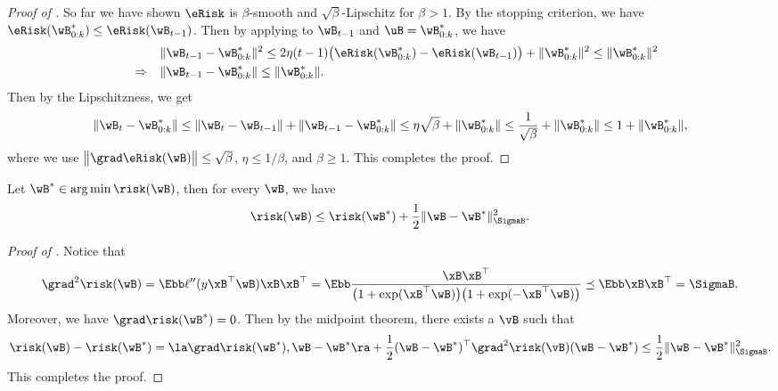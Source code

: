 \documentclass[11pt]{article}
\begin{document}
\begin{proof}[Proof of ]
So far we have shown $\eRisk$ is $\beta$-smooth and $\sqrt{\beta}$-Lipschitz for $\beta>1$. 
By the stopping criterion, we have $\eRisk(\wB^*_{0:k})\le \eRisk(\wB_{t-1})$.
Then by applying  to $\wB_{t-1}$ and $\uB=\wB^*_{0:k}$, we have 
\begin{align*}
  &  \|\wB_{t-1}-\wB^*_{0:k}\|^2 \le 2\eta (t-1) \big(\eRisk(\wB^*_{0:k}) - \eRisk(\wB_{t-1}) \big) + \|\wB^*_{0:k}\|^2 \le \|\wB^*_{0:k}\|^2 \\
    \quad \Rightarrow \quad &
    \|\wB_{t-1} - \wB^*_{0:k}\|\le \|\wB^*_{0:k}\|.
\end{align*}
Then by the Lipschitzness, we get 
\begin{align*}
   \|\wB_{t} - \wB^*_{0:k}\|\le \|\wB_{t} - \wB_{t-1}\| + \|\wB_{t-1} - \wB^*_{0:k}\|\le \eta \sqrt{\beta} + \|\wB^*_{0:k}\|
   \le \frac{1}{\sqrt{\beta}} + \|\wB^*_{0:k}\| \le 1 + \|\wB^*_{0:k}\|,
\end{align*}
where we use $\big\|\grad \eRisk(\wB)\big\|\le \sqrt{\beta}$, $\eta\le 1/\beta$, and $\beta\ge 1$. This completes the proof.
\end{proof}


\begin{lemma}\label{lemma:loss-tail}
Let $\wB^*\in \arg\min \risk(\wB)$, then for every $\wB$, we have 
\begin{align*}
\risk(\wB) \le \risk(\wB^*) + \frac{1}{2}\|\wB - \wB^*\|_{\SigmaB}^2.   
\end{align*}
\end{lemma}
\begin{proof}[Proof of ]
Notice that 
\begin{align*}
    \grad^2 \risk(\wB) = \Ebb \ell''(y \xB^\top \wB) \xB \xB^\top 
    = \Ebb \frac{\xB \xB^\top}{\big(1+\exp(\xB^\top \wB)\big)\big(1+\exp(-\xB^\top \wB)\big)} \preceq \Ebb \xB\xB^\top = \SigmaB.
\end{align*}
Moreover, we have $\grad \risk(\wB^*) = 0$.
Then by the midpoint theorem, there exists a $\vB$ such that
\begin{align*}
    \risk(\wB) 
    - \risk(\wB^*) = \la \grad \risk(\wB^*), \wB-\wB^*\ra + \frac{1}{2} (\wB-\wB^*)^\top \grad^2 \risk(\vB)(\wB-\wB^*) 
    \le  \frac{1}{2}\|\wB-\wB^*\|^2_{\SigmaB}.
\end{align*}
This completes the proof.
\end{proof}
\end{document}

